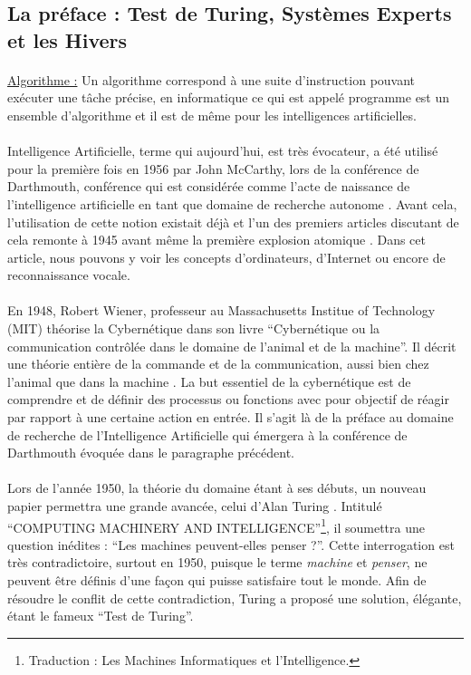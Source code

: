 \documentclass[10pt, french, a4paper]{report}
\begin{document}
\subsection{La préface : Test de Turing, Systèmes Experts et les Hivers}

\paragraph{}\underline{Algorithme :} Un algorithme correspond à une suite d'instruction pouvant exécuter une tâche précise, en informatique ce qui est appelé programme est un ensemble d'algorithme et il est de même pour les intelligences artificielles.

\paragraph{}
Intelligence Artificielle, terme qui aujourd’hui, est très évocateur, a été utilisé pour la première fois en 1956 par John McCarthy, lors de la conférence de Darthmouth, conférence qui est considérée comme l’acte de naissance de l’intelligence artificielle en tant que domaine de recherche autonome \citep{solomonoff_time_1985}. Avant cela, l'utilisation de cette notion existait déjà et l'un des premiers articles discutant de cela remonte à 1945 avant même la première explosion atomique \citep{bush_as_1945}. Dans cet article, nous pouvons y voir les concepts d'ordinateurs, d'Internet ou encore de reconnaissance vocale.

\paragraph{}
En 1948, Robert Wiener, professeur au Massachusetts Institue of Technology (MIT) théorise la Cybernétique dans son livre ``Cybernétique ou la communication contrôlée dans le domaine de l'animal et de la machine''. Il décrit une théorie entière de la commande et de la communication, aussi bien chez l'animal que dans la machine \citep{wiener_cybernetics;_1961}. La but essentiel de la cybernétique est de comprendre et de définir des processus ou fonctions avec pour objectif de réagir par rapport à une certaine action en entrée. Il s'agit là de la préface au domaine de recherche de l'Intelligence Artificielle qui émergera à la conférence de Darthmouth évoquée dans le paragraphe précédent.

\paragraph{}
Lors de l'année 1950, la théorie du domaine étant à ses débuts, un nouveau papier permettra une grande avancée, celui d'Alan Turing \citep{turing_i.computing_1950}. Intitulé ``COMPUTING MACHINERY AND INTELLIGENCE''\footnote{Traduction : Les Machines Informatiques et l'Intelligence.}, il soumettra une question inédites : ``Les machines peuvent-elles penser ?''. Cette interrogation est très contradictoire, surtout en 1950, puisque le terme \textit{machine} et \textit{penser}, ne peuvent être définis d’une façon qui puisse satisfaire tout le monde. Afin de résoudre le conflit de cette contradiction, Turing a proposé une solution, élégante, étant le fameux ``Test de Turing''. 
\end{document}
